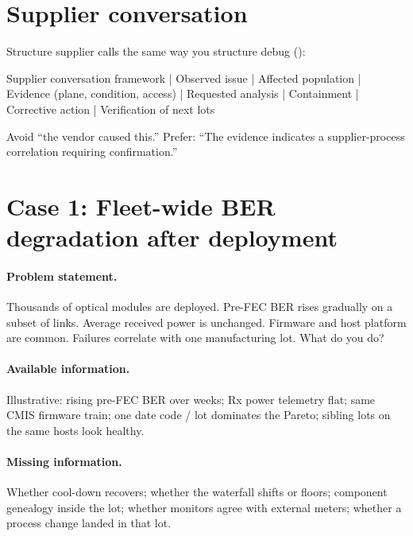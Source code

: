 \section{Supplier conversation}
\label{sec:case-supplier-talk}

Structure supplier calls the same way you structure debug
():

\begin{dectree}
Supplier conversation framework
  |
Observed issue
  |
Affected population
  |
Evidence (plane, condition, access)
  |
Requested analysis
  |
Containment
  |
Corrective action
  |
Verification of next lots
\end{dectree}

Avoid ``the vendor caused this.'' Prefer: ``The evidence indicates a
supplier-process correlation requiring confirmation.''

\section{Case 1: Fleet-wide BER degradation after deployment}
\label{sec:case-fleet-ber}

\paragraph{Problem statement.}
Thousands of optical modules are deployed. Pre-FEC BER rises gradually on a
subset of links. Average received power is unchanged. Firmware and host platform
are common. Failures correlate with one manufacturing lot. What do you do?


\paragraph{Available information.}
Illustrative: rising pre-FEC BER over weeks; Rx power telemetry flat; same CMIS
firmware train; one date code / lot dominates the Pareto; sibling lots on the
same hosts look healthy.

\paragraph{Missing information.}
Whether cool-down recovers; whether the waterfall shifts or floors; component
genealogy inside the lot; whether monitors agree with external meters; whether
a process change landed in that lot.

